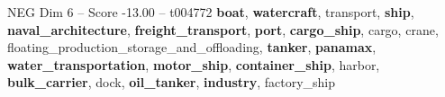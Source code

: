 \begin{textsample}{NEG Dim 6 – Score -13.00 – t004772}  \label{ex:f6_neg_003}
\textbf{boat}, \textbf{watercraft}, transport, \textbf{ship}, \textbf{naval\_architecture}, \textbf{freight\_transport}, \textbf{port}, \textbf{cargo\_ship}, cargo, crane, floating\_production\_storage\_and\_offloading, \textbf{tanker}, \textbf{panamax}, \textbf{water\_transportation}, \textbf{motor\_ship}, \textbf{container\_ship}, harbor, \textbf{bulk\_carrier}, dock, \textbf{oil\_tanker}, \textbf{industry}, factory\_ship

\end{textsample}
